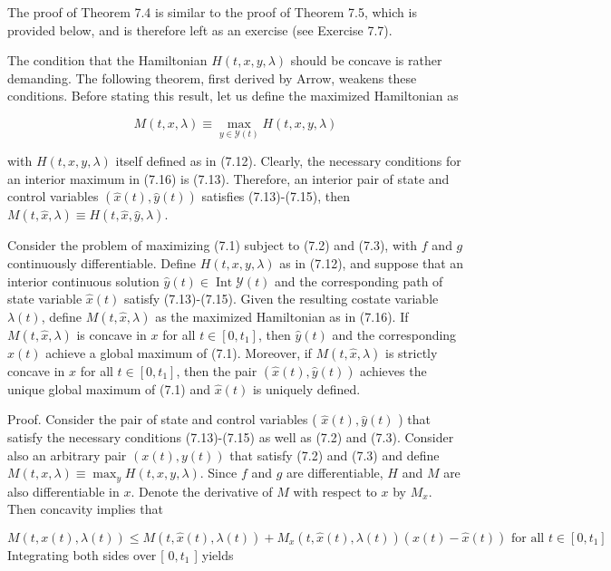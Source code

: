 \documentclass[\topdir/lecture_notes.tex]{subfiles}
\begin{document}
The proof of Theorem 7.4 is similar to the proof of Theorem 7.5, which is provided below, and is therefore left as an exercise (see Exercise 7.7).

The condition that the Hamiltonian $H(t, x, y, \lambda)$ should be concave is rather demanding. The following theorem, first derived by Arrow, weakens these conditions. Before stating this result, let us define the maximized Hamiltonian as

\[
M(t, x, \lambda) \equiv \max _{y \in \mathcal{Y}(t)} H(t, x, y, \lambda)
\]

with $H(t, x, y, \lambda)$ itself defined as in (7.12). Clearly, the necessary conditions for an interior maximum in (7.16) is (7.13). Therefore, an interior pair of state and control variables $(\hat{x}(t), \hat{y}(t))$ satisfies (7.13)-(7.15), then $M(t, \hat{x}, \lambda) \equiv H(t, \hat{x}, \hat{y}, \lambda)$.

\begin{theorem}
Consider the problem of maximizing (7.1) subject to (7.2) and (7.3), with $f$ and $g$ continuously differentiable. Define $H(t, x, y, \lambda)$ as in (7.12), and suppose that an interior continuous solution $\hat{y}(t) \in \operatorname{Int} \mathcal{Y}(t)$ and the corresponding path of state variable $\hat{x}(t)$ satisfy (7.13)-(7.15). Given the resulting costate variable $\lambda(t)$, define $M(t, \hat{x}, \lambda)$ as the maximized Hamiltonian as in (7.16). If $M(t, \hat{x}, \lambda)$ is concave in $x$ for all $t \in\left[0, t_{1}\right]$, then $\hat{y}(t)$ and the corresponding $\hat{x}(t)$ achieve a global maximum of (7.1). Moreover, if $M(t, \hat{x}, \lambda)$ is strictly concave in $x$ for all $t \in\left[0, t_{1}\right]$, then the pair $(\hat{x}(t), \hat{y}(t))$ achieves the unique global maximum of (7.1) and $\hat{x}(t)$ is uniquely defined.
\end{theorem}

Proof. Consider the pair of state and control variables ( $\hat{x}(t), \hat{y}(t)$ ) that satisfy the necessary conditions (7.13)-(7.15) as well as (7.2) and (7.3). Consider also an arbitrary pair $(x(t), y(t))$ that satisfy (7.2) and (7.3) and define $M(t, x, \lambda) \equiv \max _{y} H(t, x, y, \lambda)$. Since $f$ and $g$ are differentiable, $H$ and $M$ are also differentiable in $x$. Denote the derivative of $M$ with respect to $x$ by $M_{x}$. Then concavity implies that

\[
M(t, x(t), \lambda(t)) \leq M(t, \hat{x}(t), \lambda(t))+M_{x}(t, \hat{x}(t), \lambda(t))(x(t)-\hat{x}(t)) \text { for all } t \in\left[0, t_{1}\right]
\]
Integrating both sides over [ $0, t_{1}$ ] yields
\end{document}

